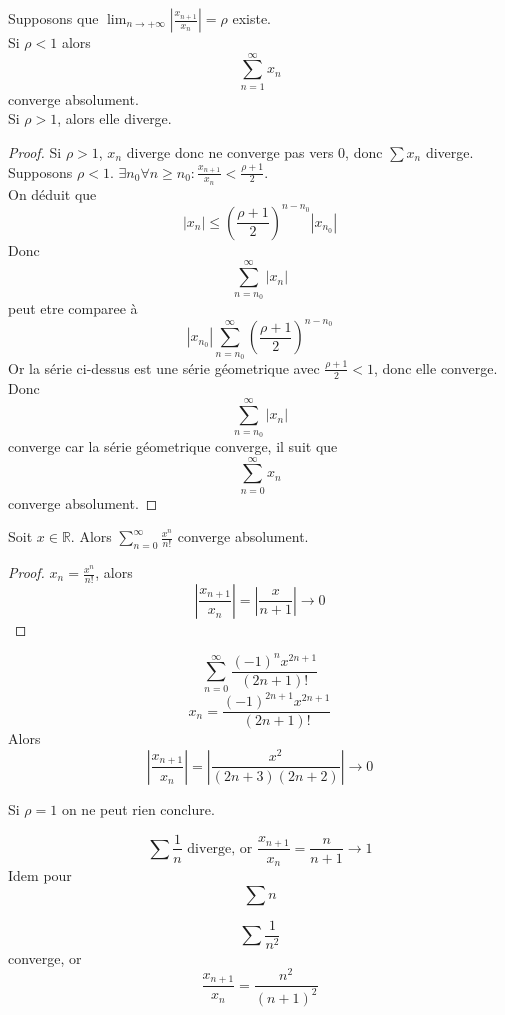 \documentclass[../main.tex]{subfiles}
\begin{document}

\begin{thm}\label{thm:critere_d_alembert}
Supposons que $\lim_{n \to  + \infty} |\frac{x_{n+1} }{x_n}|  = \rho$ existe.\\
Si $\rho <1$ alors
\[ 
\sum_{n=1}^{ \infty} x_n
\]
converge absolument.\\
Si $\rho >1$, alors elle diverge.
\end{thm}
\begin{proof}
	Si $\rho>1$, $x _n$ diverge donc ne converge pas vers 0, donc $\sum x_n$ diverge.\\
	Supposons $\rho<1$. $\exists n_0 \forall n \geq n_0: \frac{x_{n+1} }{x_n} < \frac{\rho +1}{2}$.\\
	On déduit que
	\[ 
		|x_n| \leq \left(  \frac{\rho +1}{2}\right) ^{n-n_0} |x_{n_0}| 
	\]
	Donc 
	\[ 
	\sum_{n=n_0}^{ \infty} |x_n| 
	\]
	peut etre comparee à 
	\[ 
		|x_{n_0}| \sum_{n=n_0}^{ \infty} \left( \frac{\rho+1}{2}\right) ^{n-n_0}
	\]
	Or la série ci-dessus est une série géometrique avec $\frac{\rho+1}{2}<1$, donc elle converge.\\
	Donc 
	 \[ 
	\sum_{n=n_0}^{ \infty} |x_n| 
	\]
	converge car la série géometrique converge, il suit que 
	\[ 
	\sum_{n=0}^{ \infty} x_n
	\]
	converge absolument.
\end{proof}
\begin{exemple}
Soit $x\in \mathbb{R}$. Alors $ \sum_{n=0}^{ \infty} \frac{x^{n}}{n!}$ converge absolument.\\
\begin{proof}
$x_n = \frac{x^{n}}{n!}$, alors
\[ 
| \frac{x_{n+1} }{x_n} | = | \frac{x}{n+1}| \to 0
\]

\end{proof}
\end{exemple}
\begin{exemple}
\[ 
	\sum_{n=0}^{ \infty} \frac{ ( -1)^{n} x^{2n+1}}{(2n+1)!}
\]
\[ 
	x_n = \frac{(-1)^{2n+1}x^{2n+1}}{(2n+1)!}
\]
Alors
\[ 
	| \frac{x_{n+1} }{x_n} | = | \frac{x^{2}}{(2n+3)(2n+2)}| \to 0
\]
\end{exemple}
\begin{rmq}
Si $\rho=1$ on ne peut rien conclure.
\begin{exemple}
\[ 
\sum \frac{1}{n} \text{ diverge, or }  \frac{x_{n+1}}{x_n} = \frac{n}{n+1}\to 1
\]
Idem pour
\[ 
	\sum n
\]
\end{exemple}
\begin{exemple}
\[ 
\sum \frac{1}{n^{2}}
\]
converge, or 
\[ 
	\frac{x_{n+1}}{x_n} = \frac{n^{2}}{(n+1)^{2}}
\]

\end{exemple}

\end{rmq}
\end{document}
